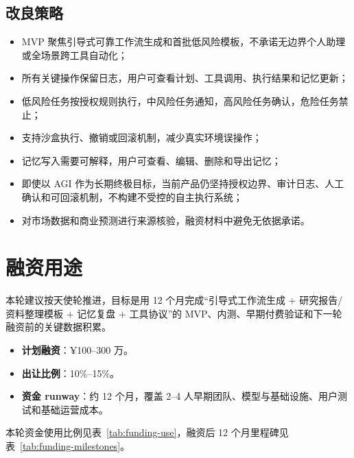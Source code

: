 \documentclass[12pt,a4paper]{ctexart}
\begin{document}
\subsection{改良策略}

\begin{itemize}
  \item MVP 聚焦引导式可靠工作流生成和首批低风险模板，不承诺无边界个人助理或全场景跨工具自动化；
  \item 所有关键操作保留日志，用户可查看计划、工具调用、执行结果和记忆更新；
  \item 低风险任务按授权规则执行，中风险任务通知，高风险任务确认，危险任务禁止；
  \item 支持沙盒执行、撤销或回滚机制，减少真实环境误操作；
  \item 记忆写入需要可解释，用户可查看、编辑、删除和导出记忆；
  \item 即使以 AGI 作为长期终极目标，当前产品仍坚持授权边界、审计日志、人工确认和可回滚机制，不构建不受控的自主执行系统；
  \item 对市场数据和商业预测进行来源核验，融资材料中避免无依据承诺。
\end{itemize}

\section{融资用途}

本轮建议按天使轮推进，目标是用 12 个月完成“引导式工作流生成 + 研究报告/资料整理模板 + 记忆复盘 + 工具协议”的 MVP、内测、早期付费验证和下一轮融资前的关键数据积累。

\begin{itemize}
  \item \textbf{计划融资}：¥100--300 万。
  \item \textbf{出让比例}：10\%--15\%。
  \item \textbf{资金 runway}：约 12 个月，覆盖 2--4 人早期团队、模型与基础设施、用户测试和基础运营成本。
\end{itemize}

本轮资金使用比例见表~\ref{tab:funding-use}，融资后 12 个月里程碑见表~\ref{tab:funding-milestones}。
\end{document}
